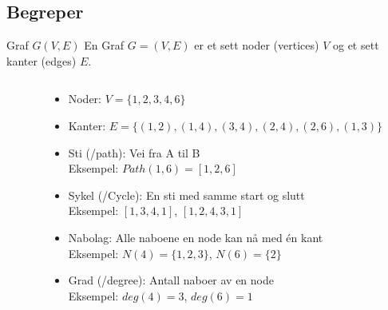 \subsection*{Begreper}
\begin{frame}
    \begin{block}{Graf $G(V,E)$}
    En Graf $G = (V, E)$ er et sett noder (vertices) $V$ og et sett kanter (edges) $E$.
    \end{block}
    \pause

\begin{columns}
    \begin{column}{0.28\textwidth}
 \end{column}
 \pause
    \begin{column}{0.68\textwidth}
\begin{itemize}[<+->]
    \item Noder: $V=\{1,2,3,4,6\}$ \pause
    \item Kanter: $E=\{(1,2), (1,4), (3,4), (2,4), (2,6), (1,3)\}$\pause
    \item Sti (/path): Vei fra A til B\\
    Eksempel: $Path(1,6)=[1,2,6]$\pause
    \item Sykel (/Cycle): En sti med samme start og slutt\\
    Eksempel: $[1,3,4,1]$, $[1,2,4,3,1]$\pause
    \item Nabolag: Alle naboene en node kan nå med én kant\\
    Eksempel: $N(4)=\{1,2,3\}$, $N(6)=\{2\}$\pause
    \item Grad (/degree): Antall naboer av en node\\
    Eksempel: $deg(4)=3$, $deg(6)=1$
\end{itemize}
 \end{column}
\end{columns}
\end{frame}

